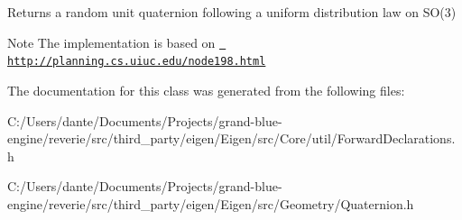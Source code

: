 \begin{DoxyReturn}{Returns}
a random unit quaternion following a uniform distribution law on S\+O(3)
\end{DoxyReturn}
\begin{DoxyNote}{Note}
The implementation is based on \href{http://planning.cs.uiuc.edu/node198.html}{\texttt{ http\+://planning.\+cs.\+uiuc.\+edu/node198.\+html}} 
\end{DoxyNote}


The documentation for this class was generated from the following files\+:\begin{DoxyCompactItemize}
\item 
C\+:/\+Users/dante/\+Documents/\+Projects/grand-\/blue-\/engine/reverie/src/third\+\_\+party/eigen/\+Eigen/src/\+Core/util/Forward\+Declarations.\+h\item 
C\+:/\+Users/dante/\+Documents/\+Projects/grand-\/blue-\/engine/reverie/src/third\+\_\+party/eigen/\+Eigen/src/\+Geometry/Quaternion.\+h\end{DoxyCompactItemize}
